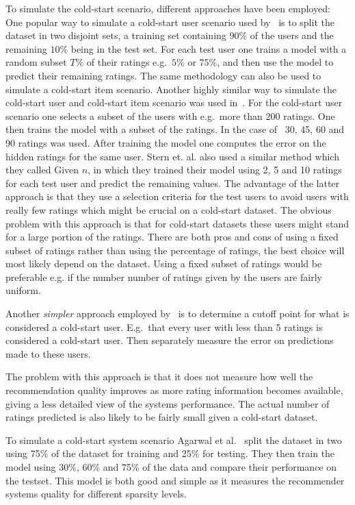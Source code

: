 To simulate the cold-start scenario, different approaches have been employed:
One popular way to simulate a cold-start user scenario used by~\cite{Stern2009,
Lam2008} is to split the dataset in two disjoint sets, a training set
containing $90\%$ of the users and the remaining $10\%$ being in the test set. For
each test user one trains a model with a random subset $T\%$ of their ratings
e.g.\ $5\%$ or $75\%$, and then use the model to predict their remaining
ratings. The same methodology can also be used to simulate a cold-start item
scenario. Another highly similar way to simulate the cold-start user and
cold-start item scenario was used in~\cite{Rashid2002, Rashid2008}. For the
cold-start user scenario one selects a subset of the users with e.g.\ more than
200 ratings. One then trains the model with a subset of the ratings. In the
case of~\cite{Rashid2002} 30, 45, 60 and 90 ratings was used. After training
the model one computes the error on the hidden ratings for the same user.
Stern et. al. \cite{Stern2009} also used a similar method which they called
Given $n$, in which they trained their model using 2, 5 and 10 ratings for each
test user and predict the remaining values.
The advantage of the latter approach is that they use a selection criteria for
the test users to avoid users with really few ratings which might be crucial on
a cold-start dataset. The obvious problem with this approach is that for
cold-start datasets these users might stand for a large portion of the ratings.
There are both pros and cons of using a fixed subset of ratings rather than
using the percentage of ratings, the best choice will most likely depend on the
dataset. Using a fixed subset of ratings would be preferable e.g. if the number
number of ratings given by the users are fairly uniform.

Another \emph{simpler} approach employed by~\cite{Massa2007, Jamali2009} is to
determine a cutoff point for what is considered a cold-start user. E.g.\ that
every user with less than 5 ratings is considered a cold-start user. Then
separately measure the error on predictions made to these users.

The problem with this approach is that it does not measure how well the
recommendation quality improves as more rating information becomes available,
giving a less detailed view of the systems performance. The actual number of
ratings predicted is also likely to be fairly small given a cold-start dataset.

To simulate a cold-start system scenario Agarwal et al.~\cite{Agarwal2009}
split the dataset in two using 75\% of the dataset for training and 25\% for
testing. They then train the model using 30\%, 60\% and 75\% of the data and
compare their performance on the testset. This model is both good and simple
as it measures the recommender systems quality for different sparsity levels.

